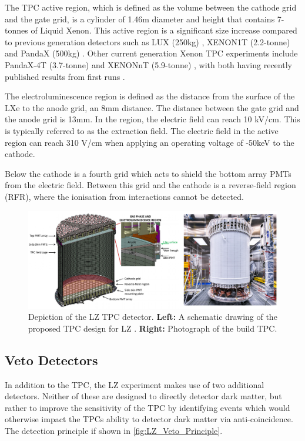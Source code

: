 \par
The TPC active region, which is defined as the volume between the cathode grid and the gate grid, is a cylinder of 1.46m diameter and height that contains 7-tonnes of Liquid Xenon.
This active region is a significant size increase compared to previous generation detectors such as LUX (250kg) \cite{lux_ref}, XENON1T (2.2-tonne) \cite{xenon1t_ref} and PandaX (500kg) \cite{pandax_ref}.
Other current generation Xenon TPC experiments include PandaX-4T (3.7-tonne) \cite{pandax_4t_ref} and XENONnT (5.9-tonne) \cite{xenonnt_projected_sensitivty_ref}, with both having recently published results from first runs \cite{pandax_4t_sr1_ref,xenonnt_sr1_er_ref}. 
\par
The electroluminescence region is defined as the distance from the surface of the LXe to the anode grid, an 8mm distance.
The distance between the gate grid and the anode grid is 13mm.
In the region, the electric field can reach 10 kV/cm.
This is typically referred to as the extraction field.
The electric field in the active region can reach 310 V/cm when applying an operating voltage of -50keV to the cathode.
\par
Below the cathode is a fourth grid which acts to shield the bottom array PMTs from the electric field.
Between this grid and the cathode is a reverse-field region (RFR), where the ionisation from interactions cannot be detected.


\begin{figure}
\includegraphics[width=\columnwidth]{Figures/LZ/lz_tpc_schematic.png}%
\caption{Depiction of the LZ TPC detector.
         \textbf{Left:} A schematic drawing of the proposed TPC design for LZ \cite{LZ_TechnicalDesignReview_ref}.
         \textbf{Right:} Photograph of the build TPC.
}
\label{fig:lz_tpc_schematic}
\end{figure}


\subsection{Veto Detectors}
\label{sec:lz_veto_detectors}
\par
In addition to the TPC, the LZ experiment makes use of two additional detectors.
Neither of these are designed to directly detector dark matter, but rather to improve the sensitivity of the TPC by identifying events which would otherwise impact the TPCs ability to detector dark matter via anti-coincidence.
The detection principle if shown in \autoref{fig:LZ_Veto_Principle}.

